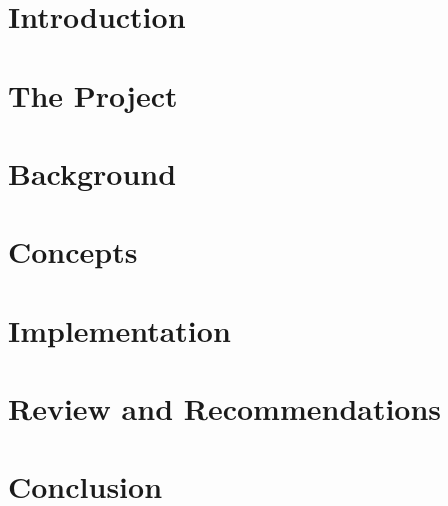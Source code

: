 \documentclass[11pt]{report}
\begin{document}
  
  
  
  
  
  \tableofcontents
  
  \chapter{Introduction}
  \label{cha:intro}
  
    
  
  \chapter{The Project}
  \label{cha:background}
  
    
  
  \chapter{Background}
  \label{cha:concBack}
    
    
  
  \chapter{Concepts}
  \label{cha:concepts}
  
    
  
  \chapter{Implementation}
  \label{cha:impl}
  
    
  
  \chapter{Review and Recommendations}
  \label{cha:review}
    
    
    
  \chapter{Conclusion}
  \label{cha:conc}
  
    
    
  \clearpage
  
  
\end{document}
